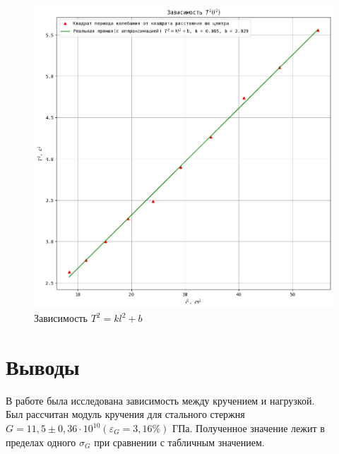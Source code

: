 \documentclass[a4paper]{article}
\begin{document}
\begin{figure}[p]
    \centering
    \includegraphics[scale=0.8]{graphic2.png}
    \caption{Зависимость $T^2 = kl^2 + b$}
\end{figure}

\newpage
\section{Выводы}
В работе была исследована зависимость между кручением и нагрузкой.\\
Был рассчитан модуль кручения для стального стержня $G = 11,5 \pm 0,36 \cdot 10^{10} (\varepsilon_{G} = 3,16\%)$ ГПа. Полученное значение лежит в пределах одного $\sigma_{G}$ при сравнении с табличным значением.
\end{document}
